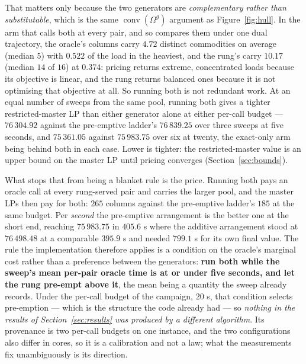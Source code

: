 That matters only because the two generators are
\emph{complementary rather than substitutable}, which is the same
$\operatorname{conv}(\Omega^{g})$ argument as
Figure~\ref{fig:hull}. In the arm that calls both at every pair, and so
compares them under one dual trajectory, the oracle's columns carry
$4.72$ distinct commodities on average (median $5$) with $0.522$ of the
load in the heaviest, and the rung's carry $10.17$ (median $14$ of
$16$) at $0.374$: pricing returns extreme, concentrated loads because
its objective is linear, and the rung returns balanced ones because it
is not optimising that objective at all. So running both is not
redundant work. At an equal number of sweeps from the same pool,
running both gives a tighter restricted-master LP than either generator
alone at either per-call budget --- $76\,304.92$ against the
pre-emptive ladder's $76\,839.25$ over three sweeps at five seconds,
and $75\,361.05$ against $75\,983.75$ over six at twenty, the
exact-only arm being behind both in each case. Lower is tighter: the
restricted-master value is an upper bound on the master LP until
pricing converges (Section~\ref{sec:bounds}).

What stops that from being a blanket rule is the price. Running both
pays an oracle call at every rung-served pair and carries the larger
pool, and the master LPs then pay for both: $265$ columns against the
pre-emptive ladder's $185$ at the same budget. Per \emph{second} the
pre-emptive arrangement is the better one at the short end, reaching
$75\,983.75$ in $405.6$ s where the additive arrangement stood at
$76\,498.48$ at a comparable $395.9$ s and needed $799.1$ s for its own
final value. The rule the implementation therefore applies is a
condition on the oracle's marginal cost rather than a preference
between the generators: \textbf{run both while the sweep's mean
per-pair oracle time is at or under five seconds, and let the rung
pre-empt above it}, the mean being a quantity the sweep already
records. Under the per-call budget of the campaign, $20$ s, that
condition selects pre-emption --- which is the structure the code
already had --- so \emph{nothing in the results of
Section~\ref{sec:results} was produced by a different algorithm}. Its
provenance is two per-call budgets on one instance, and the two
configurations also differ in cores, so it is a calibration and not a
law; what the measurements fix unambiguously is its direction.


